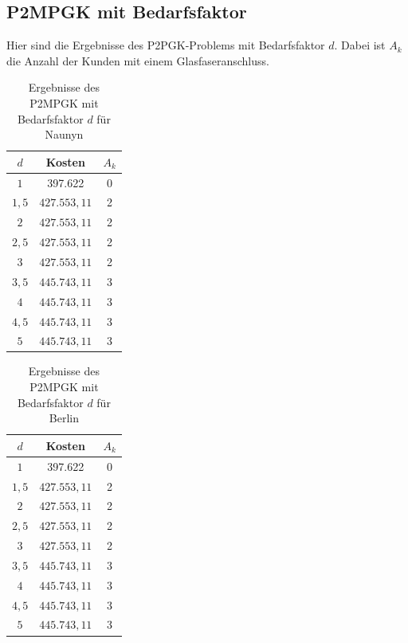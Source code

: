 \documentclass[11pt,a4paper]{article}
\theoremstyle{my_th_style1}
\begin{document}
\subsection*{P2MPGK mit Bedarfsfaktor}
Hier sind die Ergebnisse des P2PGK-Problems mit Bedarfsfaktor $d$. Dabei ist $A_k$ die Anzahl der Kunden mit einem Glasfaseranschluss.
\begin{table}[h]
	\centering
		\begin{tabular}{c|c|c}
	\centering
	$d$ & Kosten & $A_k$ \\	
	\hline
	$1$   	 &  397.622 & 0  \\
	$1,5$ 	&   $427.553,11$  & 2  \\
	$2$   	&   $427.553,11$ & 2  \\
	$2,5$   	&   $427.553,11$ & 2  \\
	$3$    &   $427.553,11$ & 2  \\
	$3,5$   	&   $445.743,11$ & 3  \\
	$4$   	&   $445.743,11$& 3  \\
	$4,5$    & $445.743,11$ & 3 \\
	$5$   	&   $445.743,11$& 3  \\
\end{tabular}
	\label{P2MPGKBedarfN}
	\caption{Ergebnisse des P2MPGK mit Bedarfsfaktor $d$ f\"ur Naunyn} 
\end{table}

\begin{table}[h]
			\centering
			\begin{tabular}{c|c|c}
				\centering
				$d$ & Kosten & $A_k$ \\	
		\hline
	$1$   	 &  397.622 & 0  \\
	$1,5$ 	&   $427.553,11$  & 2  \\
	$2$   	&   $427.553,11$ & 2  \\
	$2,5$   	&   $427.553,11$ & 2  \\
	$3$    &   $427.553,11$ & 2  \\
	$3,5$   	&   $445.743,11$ & 3  \\
	$4$   	&   $445.743,11$& 3  \\
	$4,5$    & $445.743,11$ & 3 \\
	$5$   	&   $445.743,11$& 3  \\	
			\end{tabular}
			\label{P2PGKBedarfB}
			\caption{Ergebnisse des P2MPGK mit Bedarfsfaktor $d$ f\"ur Berlin} 
\end{table}
\end{document}
